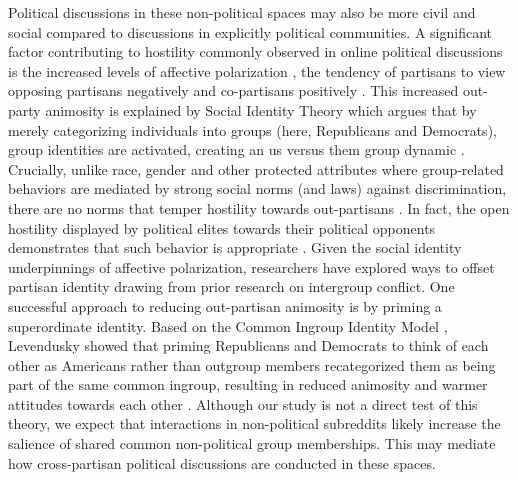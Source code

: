 \documentclass[letterpaper]{article} %
\begin{document}
Political discussions in these non-political spaces may also be more civil and social compared to discussions in explicitly political communities. A significant factor contributing to hostility commonly observed in online political discussions is the increased levels of affective polarization \cite{hutchens2019reinforcing}, the tendency of partisans to view opposing partisans negatively and co-partisans positively \cite{iyengar2015fear}. This increased out-party animosity is explained by Social Identity Theory which argues that by merely categorizing individuals into groups (here, Republicans and Democrats), group identities are activated, creating an us versus them group dynamic \cite{tajfel1979integrative}. Crucially, unlike race, gender and other protected attributes where group-related behaviors are mediated by strong social norms (and laws) against discrimination, there are no norms that temper hostility towards out-partisans \cite{iyengar2019origins}. In fact, the open hostility displayed by political elites towards their political opponents demonstrates that such behavior is appropriate \cite{banda2018elite}. Given the social identity underpinnings of affective polarization, researchers have explored ways to offset partisan identity drawing from prior research on intergroup conflict. One successful approach to reducing out-partisan animosity is by priming a superordinate identity. Based on the Common Ingroup Identity Model \cite{gaertner2011common}, Levendusky showed that priming Republicans and Democrats to think of each other as Americans rather than outgroup members recategorized them as being part of the same common ingroup, resulting in reduced animosity and warmer attitudes towards each other \cite{levendusky2018americans}.  Although our study is not a direct test of this theory, we expect that interactions in non-political subreddits likely increase the salience of shared common non-political group memberships. This may mediate how cross-partisan political discussions are conducted in these spaces. 
\end{document}
